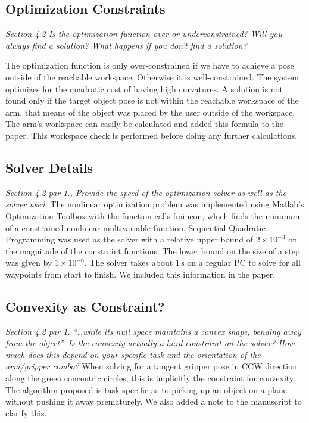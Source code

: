\documentclass[letterpaper, 10 pt, twocolumn, conference]{article}
\newcommand{\unit}[1]{\ensuremath{\, \mathrm{#1}}} %
\begin{document}
\subsection{Optimization Constraints}
\textit{Section 4.2 Is the optimization function over or underconstrained? Will you always find a solution? What happens if you don’t find a solution?}

The optimization function is only over-constrained if we have to achieve a pose outside of the reachable workspace. Otherwise it is well-constrained. The system optimizes for the quadratic cost of having high curvatures. A solution is not found only if the target object pose is not within the reachable workspace of the arm, that means of the object was placed by the user outside of the workspace. The arm’s workspace can easily be calculated and added this formula to the paper. This workspace check is performed before doing any further calculations.

\subsection{Solver Details}
\textit{Section 4.2 par 1., Provide the speed of the optimization solver as well as the solver used.}
%
The nonlinear optimization problem was implemented using Matlab’s Optimization Toolbox with the function calls fmincon, which finds the minimum of a constrained nonlinear multivariable function. Sequential Quadratic Programming was used as the solver with a relative upper bound of $2 \times 10^{-3}$ on the magnitude of the constraint functions. The lower bound on the size of a step was given by $1 \times 10^{-6}$. The solver takes about 1\unit{s} on a regular PC to solve for all waypoints from start to finish. We included this information in the paper.
%
\subsection{Convexity as Constraint?}
\textit{Section 4.2 par 1. “…while its null space maintains a convex shape, bending away from the object”. Is the convexity actually a hard constraint on the solver? How much does this depend on your specific task and the orientation of the arm/gripper combo?}
%
When solving for a tangent gripper pose in CCW direction along the green concentric circles, this is implicitly the constraint for convexity. The algorithm proposed is task-specific as to picking up an object on a plane without pushing it away prematurely. We also added a note to the manuscript to clarify this.
%
\end{document}
